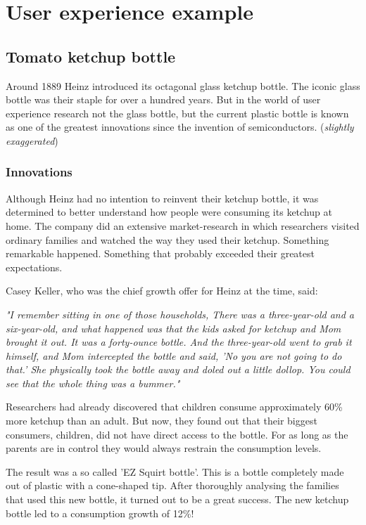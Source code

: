 \chapter{User experience example}\label{app:user_experience}
\section{Tomato ketchup bottle}
Around 1889 Heinz introduced its octagonal glass ketchup bottle. The iconic glass bottle was their staple for over a hundred years. But in the world of user experience research not the glass bottle, but the current plastic bottle is known as one of the greatest innovations since the invention of semiconductors. (\textit{slightly exaggerated})

\subsection{Innovations}
Although Heinz had no intention to reinvent their ketchup bottle, it was determined to better understand how people were consuming its ketchup at home. 
The company did an extensive market-research in which researchers visited ordinary families and watched the way they used their ketchup. Something remarkable happened. Something that probably exceeded their greatest expectations.

Casey Keller, who was the chief growth offer for Heinz at the time, said: 

\begin{displayquote}
    \textit{
    "I remember sitting in one of those households, There was a three-year-old and a six-year-old, and what happened was that the kids asked for ketchup and Mom brought it out. It was a forty-ounce bottle. And the three-year-old went to grab it himself, and Mom intercepted the bottle and said, 'No you are not going to do that.' She physically took the bottle away and doled out a little dollop. You could see that the whole thing was a bummer."}
    \cite{Gladwell2009}
\end{displayquote}

Researchers had already discovered that children consume approximately 60\% more ketchup than an adult. But now, they found out that their biggest consumers, children, did not have direct access to the bottle. For as long as the parents are in control they would always restrain the consumption levels. 

The result was a so called 'EZ Squirt bottle'. This is a bottle completely made out of plastic with a cone-shaped tip. After thoroughly analysing the families that used this new bottle, it turned out to be a great success. The new ketchup bottle led to a consumption growth of 12\%!

